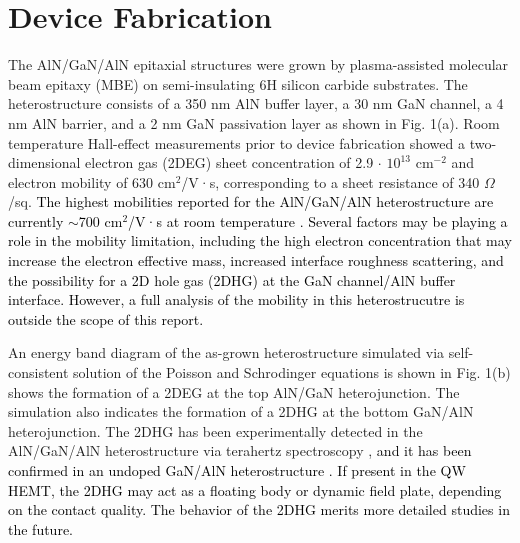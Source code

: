 \documentclass[journal]{IEEEtran}
\begin{document}
\section{Device Fabrication}
The AlN/GaN/AlN epitaxial structures were grown by plasma-assisted molecular beam epitaxy (MBE) on semi-insulating 6H silicon carbide substrates. The heterostructure consists of a 350 nm AlN buffer layer, a 30 nm GaN channel, a 4 nm AlN barrier, and a 2 nm GaN passivation layer as shown in Fig. 1(a). Room temperature Hall-effect measurements prior to device fabrication showed a two-dimensional electron gas (2DEG) sheet concentration of 2.9 $\cdot$ $\mathrm{10^{13}}$ $\mathrm{cm^{-2}}$ and electron mobility of 630 $\mathrm{cm^2}$/V·s, corresponding to a sheet resistance of 340 $\Omega$/sq.  \textcolor{black}{The highest mobilities reported for the AlN/GaN/AlN heterostructure are currently $\sim$700 $\mathrm{cm^2}$/V·s at room temperature \cite{Wang2012,Islam2016,Song2017,Rennesson2018}. Several factors may be playing a role in the mobility limitation, including the high electron concentration that may increase the electron effective mass, increased interface roughness scattering, and the possibility for a 2D hole gas (2DHG) at the GaN channel/AlN buffer interface. However, a full analysis of the mobility in this heterostrucutre is outside the scope of this report.}

An energy band diagram of the as-grown heterostructure simulated via self-consistent solution of the Poisson and Schrodinger equations \cite{Tan1990} is shown in Fig. 1(b) shows the formation of a 2DEG at the top AlN/GaN heterojunction. The simulation also indicates the formation of a 2DHG at the bottom GaN/AlN heterojunction. The 2DHG has been experimentally detected in the AlN/GaN/AlN heterostructure via terahertz spectroscopy \cite{Jena2017}, \textcolor{black}{and it has been confirmed in an undoped GaN/AlN heterostructure \cite{Chaudhuri2018}. If present in the QW HEMT, the 2DHG may act as a floating body or dynamic field plate, depending on the contact quality. The behavior of the 2DHG merits more detailed studies in the future.}
\end{document}
